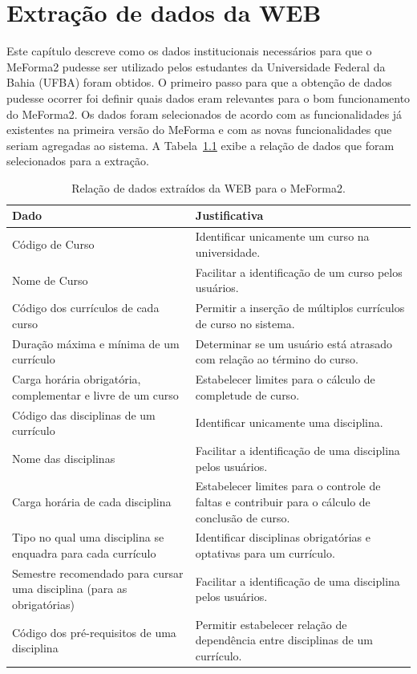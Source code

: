 \chapter{Extração de dados da WEB}
Este capítulo descreve como os dados institucionais necessários para que o MeForma2 pudesse ser utilizado pelos estudantes da Universidade Federal da Bahia (UFBA) foram obtidos. O primeiro passo para que a obtenção de dados pudesse ocorrer foi definir quais dados eram relevantes para o bom funcionamento do MeForma2. Os dados foram selecionados de acordo com as funcionalidades já existentes na primeira versão do MeForma e com as novas funcionalidades que seriam agregadas ao sistema. A Tabela~\ref{data} exibe a relação de dados que foram selecionados para a extração.

\begin{table}[H]
\begin{center}
\caption{Relação de dados extraídos da WEB para o MeForma2.}
\begin{tabular}{ |p{6cm}|p{8cm}| }
\hline
 \textbf{Dado} & \textbf{Justificativa} \\ 
 \hline
 Código de Curso & Identificar unicamente um curso na universidade. \\
 \hline
 Nome de Curso & Facilitar a identificação de um curso pelos usuários. \\
 \hline
 Código dos currículos de cada curso & Permitir a inserção de múltiplos currículos de curso no sistema. \\
 \hline
 Duração máxima e mínima de um currículo & Determinar se um usuário está atrasado com relação ao término do curso. \\
 \hline
 Carga horária obrigatória, complementar e livre de um curso & Estabelecer limites para o cálculo de completude de curso.\\
 \hline
 Código das disciplinas de um currículo & Identificar unicamente uma disciplina. \\
 \hline
 Nome das disciplinas & Facilitar a identificação de uma disciplina pelos usuários. \\
 \hline
 Carga horária de cada disciplina & Estabelecer limites para o controle de faltas e contribuir para o cálculo de conclusão de curso. \\
 \hline
 Tipo no qual uma disciplina se enquadra para cada currículo & Identificar disciplinas obrigatórias e optativas para um currículo. \\
 \hline
 Semestre recomendado para cursar uma disciplina (para as obrigatórias) & Facilitar a identificação de uma disciplina pelos usuários. \\
 \hline
 Código dos pré-requisitos de uma disciplina & Permitir estabelecer relação de dependência entre disciplinas de um currículo. \\
 \hline
\end{tabular}
\end{center}
\label{data}
\end{table}

